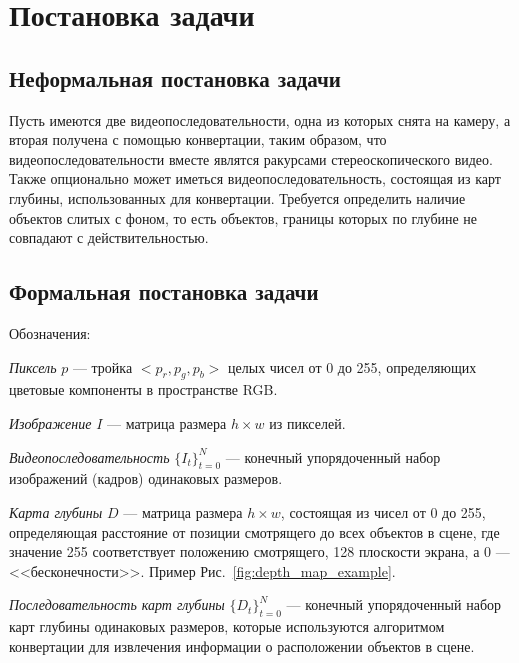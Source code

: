 \documentclass[14pt, a4paper]{extarticle}
\begin{document}
\newpage
\section{Постановка задачи}

\subsection{Неформальная постановка задачи}

Пусть имеются две видеопоследовательности, одна из которых снята на камеру, 
а вторая получена с помощью конвертации, таким образом, 
что видеопоследовательности вместе являтся ракурсами стереоскопического видео. 
Также опционально может иметься видеопоследовательность, состоящая из карт глубины, 
использованных для конвертации. Требуется определить наличие объектов слитых с фоном, 
то есть объектов, границы которых по глубине не совпадают с действительностью.

\subsection{Формальная постановка задачи}

Обозначения:

\textit{Пиксель} $p$ --- тройка $<p_r,p_g,p_b>$ целых чисел от 0 до 255, 
определяющих цветовые компоненты в пространстве RGB.

\textit{Изображение} $I$ --- матрица размера $h \times w$ из пикселей.

\textit{Видеопоследовательность} $\{I_t\}_{t=0}^N$ --- конечный упорядоченный набор 
изображений (кадров) одинаковых размеров.



\textit{Карта глубины} $D$ --- матрица размера $h \times w$, состоящая из чисел от 0 до 255,
определяющая расстояние от позиции смотрящего до всех объектов в сцене, 
где значение 255 соответствует положению смотрящего, 128 плоскости экрана, 
а 0 --- <<бесконечности>>. Пример Рис.~\ref{fig:depth_map_example}.

\textit{Последовательность карт глубины} $\{D_t\}_{t=0}^N$ --- конечный упорядоченный 
набор карт глубины одинаковых размеров, которые используются алгоритмом конвертации 
для извлечения информации о расположении объектов в сцене.
\end{document}
